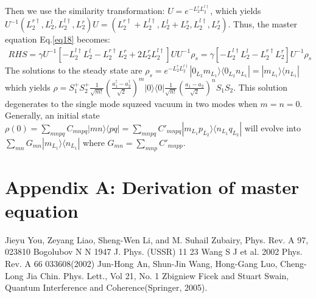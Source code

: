 \documentclass{article}
\begin{document}
Then we use the similarity transformation: $U=e^{-L_2^{r}L_2^{l\dagger}}$, which yields $U^{-1}(L_{2}^{r\dagger},L_{2}^{l},L_{2}^{l\dagger},L_{2}^{r})U=(L_{2}^{r\dagger}+L_{2}^{l\dagger},L_{2}^{l}+L_{2}^{r},L_{2}^{l\dagger},L_{2}^{r}) $. Thus, the master equation Eq.\eqref{eq18} becomes:
\begin{equation}
\label{eq18}
\begin{split}
RHS=\gamma U^{-1}[-L_2^{l\dagger}L_2^{l}-L_2^{r\dagger}L_2^{r}+2L_2^{r}L_2^{l\dagger}]UU^{-1}\rho_{s}=\gamma[-L_2^{l\dagger}L_2^{l}-L_2^{r\dagger}L_2^{r}]U^{-1}\rho_{s}
\end{split}
\end{equation}
The solutions to the steady state are $\rho_{s}=e^{-L_{2}^{r}L_{2}^{l\dagger}}|0_{L_{2}}m_{L_{1}}\rangle\langle0_{L_{2}}n_{L_{1}}|=|m_{L_{1}}\rangle\langle n_{L_{1}}|$ which yields $\rho=S_{1}^{+}S_{2}^{+}\frac{1}{\sqrt{m!}}(\frac{a_{1}^{\dagger}-a_{2}^{\dagger}}{\sqrt{2}})^{m}|0\rangle\langle0|\frac{1}{\sqrt{n!}}(\frac{a_{1}-a_{2}}{\sqrt{2}})^{n}S_{1}S_{2}$. This solution degenerates to the single mode squzeed vacuum in two modes when $m=n=0$. Generally, an initial state $\rho(0)=\sum_{mnpq}C_{mnpq}|mn\rangle\langle pq|=\sum_{mnpq}C'_{mnpq}|m_{L_{1}}p_{L_{2}}\rangle\langle n_{L_{1}}q_{L_{2}}|$ will evolve into $\sum_{mn}G_{mn}|m_{L_{1}}\rangle\langle n_{L_{1}}|$ where $G_{mn}=\sum_{mnp}C'_{mnpp}$.

\appendix

\section{Appendix A: Derivation of master equation}




\begin{thebibliography}{99}
 Jieyu You, Zeyang Liao, Sheng-Wen Li, and M. Suhail Zubairy, Phys. Rev. A 97, 023810 
 Bogolubov N N 1947 J. Phys. (USSR) 11 23
 Wang S J et al. 2002 Phys. Rev. A 66 033608(2002)
 Jun-Hong An, Shun-Jin Wang, Hong-Gang Luo, Cheng-Long Jia Chin. Phys. Lett., Vol 21, No. 1
 Zbigniew Ficek and Stuart Swain, Quantum Interference
and Coherence(Springer, 2005).

\end{thebibliography} 
\end{document}
